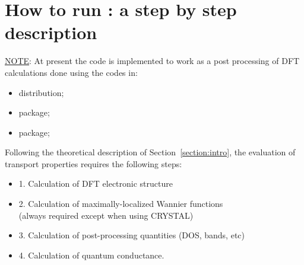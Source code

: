 
\thispagestyle{empty}
\section{How to run \WANT{}: a step by step description}\label{sec:run}

\noindent \underline {NOTE}: At present the \WANT{} code is
implemented to work as a post processing of DFT
calculations done using the codes in: 
\begin{itemize}
  \item[\mydot]  \QUANTUMESPRESSO{} distribution;
  \item[\mydot]  \ABINIT{} package;
  \item[\mydot]  \CRYSTAL{} package;
\end{itemize}

\noindent Following the theoretical description of
Section~\ref{section:intro}, the evaluation of transport
properties requires the following steps:

\begin{itemize}
\item[\mydot] 1. Calculation of DFT electronic structure
\item[\mydot] 2. Calculation of maximally-localized Wannier functions \\
                 (always required except when using CRYSTAL)
\item[\mydot] 3. Calculation of post-processing quantities (DOS, bands, etc)
\item[\mydot] 4. Calculation of quantum conductance.
\end{itemize}


